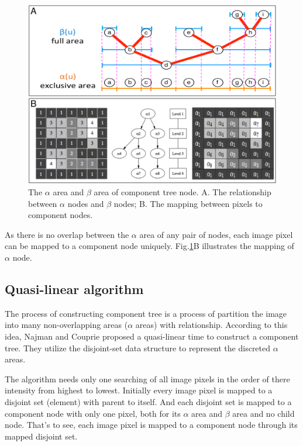 \begin{figure}[htbp]
\centering
\includegraphics[width=1.0\textwidth]{images/cptree_alpha}
\caption[The $\alpha$ area and $\beta$ area of component tree node]{The $\alpha$ area and $\beta$ area of component tree node. A. The relationship between $\alpha$ nodes and $\beta$ nodes; B. The mapping between pixels to component nodes.}
\label{fig:cptree-alpha}
\end{figure}

As there is no overlap between the $\alpha$ area of any pair of nodes, each image pixel can be mapped to a component node uniquely. Fig.\ref{fig:cptree-alpha}B illustrates the mapping of $\alpha$ node.

\subsection{Quasi-linear algorithm}
The process of constructing component tree is a process of partition the image into many non-overlapping areas ($\alpha$ areas) with relationship. According to this idea, Najman and Couprie\cite{najman2006building} proposed a quasi-linear time to construct a component tree. They utilize the disjoint-set data structure  to represent the discreted $\alpha$ areas.

The algorithm needs only one searching of all image pixels in the order of there intensity from highest to lowest. Initially every image pixel is mapped to a disjoint set (element) with parent to itself. And each disjoint set is mapped to a component node with only one pixel, both for its $\alpha$ area and $\beta$ area and no child node. That's to see, each image pixel is mapped to a component node through its mapped disjoint set.

